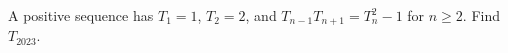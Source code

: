 A positive sequence has $T_1=1$, $T_2=2$, and $T_{n-1}T_{n+1}=T_n^2-1$ for $n\ge2$. Find $T_{2023}$.
